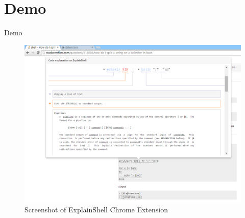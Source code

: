 \documentclass[xcolor=dvipsnames]{beamer}
\begin{document}
\section{Demo}\label{demo}
\begin{frame}{Demo}
\begin{figure}[h]
  \includegraphics[width=.8\textwidth]{screenshot.png}
  \caption{Screenshot of ExplainShell Chrome Extension}
\end{figure}
\end{frame}
\end{document}
